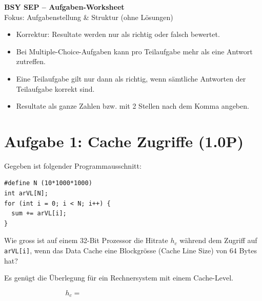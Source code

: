 \documentclass[a4paper,11pt]{article}
\begin{document}
\begin{center}
{\LARGE \textbf{BSY SEP -- Aufgaben-Worksheet}}\\[0.5em]
{\large Fokus: Aufgabenstellung \& Struktur (ohne Lösungen)}
\end{center}

\begin{tcolorbox}[colback=yellow!10!white,colframe=orange!65!black,title=Allgemeine Hinweise aus dem Blatt]
\begin{itemize}[leftmargin=*]
  \item Korrektur: Resultate werden nur als richtig oder falsch bewertet.
  \item Bei Multiple-Choice-Aufgaben kann pro Teilaufgabe mehr als eine Antwort zutreffen.
  \item Eine Teilaufgabe gilt nur dann als richtig, wenn sämtliche Antworten der Teilaufgabe korrekt sind.
  \item Resultate als ganze Zahlen bzw. mit 2 Stellen nach dem Komma angeben.
\end{itemize}
\end{tcolorbox}

\section{Aufgabe 1: Cache Zugriffe (1.0P)}
Gegeben ist folgender Programmausschnitt:

\begin{verbatim}
#define N (10*1000*1000)
int arVL[N];
for (int i = 0; i < N; i++) {
  sum += arVL[i];
}
\end{verbatim}

Wie gross ist auf einem 32-Bit Prozessor die Hitrate $h_c$ während dem Zugriff auf \texttt{arVL[i]},
wenn das Data Cache eine Blockgrösse (Cache Line Size) von 64 Bytes hat?

\begin{tcolorbox}[colback=blue!6!white,colframe=blue!50!black,title=Hinweis]
Es genügt die Überlegung für ein Rechnersystem mit einem Cache-Level.
\end{tcolorbox}

\[
h_c = \hspace{7cm}
\]
\end{document}
